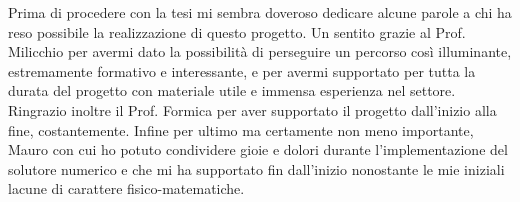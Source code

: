 Prima di procedere con la tesi mi sembra doveroso dedicare alcune parole a chi ha reso possibile la realizzazione
di questo progetto.
Un sentito grazie al Prof. Milicchio per avermi dato la possibilità di perseguire un percorso così illuminante, estremamente formativo e interessante, e per
avermi supportato per tutta la durata del progetto con materiale utile e immensa esperienza nel settore. Ringrazio inoltre il Prof. Formica per aver supportato il progetto
dall'inizio alla fine, costantemente.
Infine per ultimo ma certamente non meno importante, Mauro con cui ho potuto condividere gioie e dolori durante l'implementazione del solutore numerico e
che mi ha supportato fin dall'inizio nonostante le mie iniziali lacune di carattere fisico-matematiche.